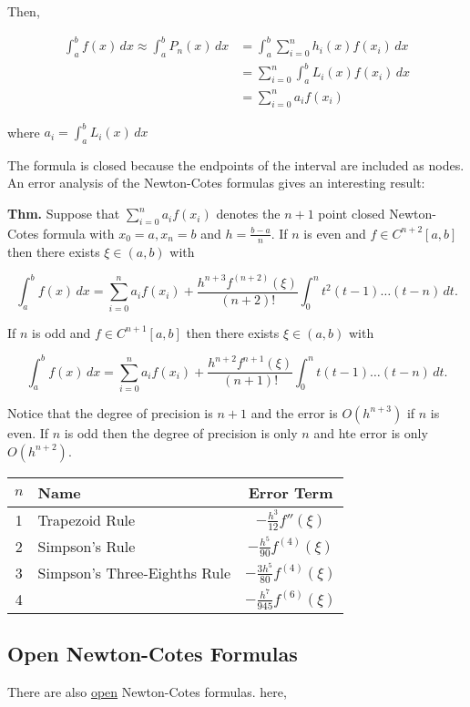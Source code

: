 \documentclass[12pt]{article}
\newcommand{\thm}{\textbf{Thm.}\xspace}
\begin{document}
\noindent
Then,

\begin{align*}
  \int_{a}^{b} f(x) \, dx \approx \int_{a}^{b} P_n(x) \, dx 
  &= \int_{a}^{b} \sum_{i=0}^{n} h_i(x)f(x_i) \, dx \\
  &= \sum_{i = 0}^{n} \int_{a}^{b} L_i(x)f(x_i) \, dx \\
  &= \sum_{i = 0}^{n} a_i f(x_i)
\end{align*}

where $\displaystyle a_i = \int_{a}^{b} L_i(x) \, dx$

The formula is closed because the endpoints of the interval are included as
nodes. An error analysis of the Newton-Cotes formulas gives an interesting
result:

\thm Suppose that $\displaystyle \sum_{i = 0}^{n} a_if(x_i)$ denotes the $n+1$
point closed Newton-Cotes formula with $x_0=a, x_n=b$ and $h = \frac{b-a}{n}$.
If $n$ is even and $f\in C^{n+2}[a,b]$ then there exists $\xi \in (a,b)$ with 

\[
\int_{a}^{b} f(x) \, dx = \sum_{i = 0}^{n} a_if(x_i) +
\frac{h^{n+3}f^{(n+2)}(\xi)}{(n+2)!} \int_{0}^{n} t^2(t-1)\dots (t-n) \, dt
.\]

If $n$ is odd and $f\in C^{n+1}[a,b]$ then there exists $\xi \in (a,b)$ with

\[
  \int_{a}^{b} f(x) \, dx = \sum_{i = 0}^{n} a_if(x_i) +
  \frac{h^{n+2}f^{n+1}(\xi)}{(n+1)!} \int_{0}^{n} t(t-1)\dots(t-n) \, dt
.\]

Notice that the degree of precision is $n+1$ and the error is $O(h^{n+3})$ if
$n$ is even. If $n$ is odd then the degree of precision is only $n$ and hte
error is only $O(h^{n+2})$.

\begin{center}
  \begin{tabular}{c|l c}
    $n$ & \textbf{Name} & \textbf{Error Term} \\
    \hline
    1 & Trapezoid Rule & $-\frac{h^3}{12} f''(\xi)$ \\
    2 & Simpson's Rule & $-\frac{h^5}{90} f^{(4)}(\xi)$ \\
    3 & Simpson's Three-Eighths Rule & $-\frac{3h^5}{80} f^{(4)}(\xi)$ \\
    4 & & $-\frac{h^7}{945} f^{(6)}(\xi)$ \\
  \end{tabular}
\end{center}

\subsection{Open Newton-Cotes Formulas}
\label{sec:open_newton_cotes_formulas}
There are also \uline{open} Newton-Cotes formulas. here,
\end{document}

